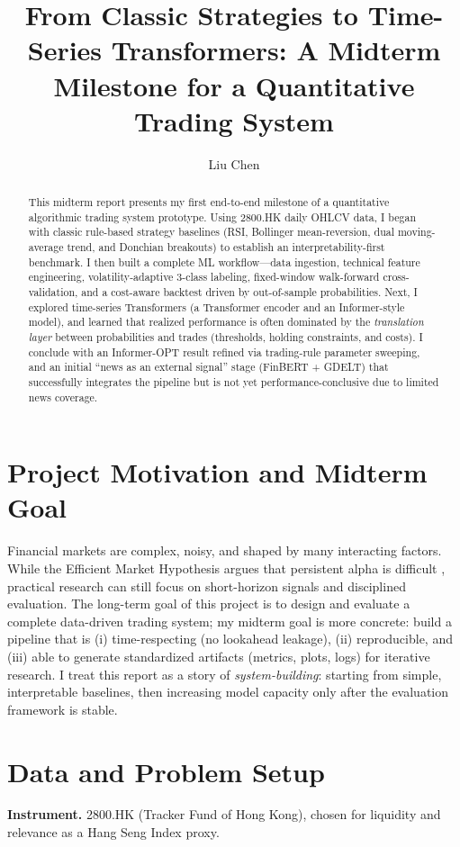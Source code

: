 \documentclass[letterpaper]{article} %
\title{From Classic Strategies to Time-Series Transformers: A Midterm Milestone for a Quantitative Trading System}
\author{
Liu Chen\\
}
\begin{document}
\maketitle

\begin{abstract}
This midterm report presents my first end-to-end milestone of a quantitative algorithmic trading system prototype. Using 2800.HK daily OHLCV data, I began with classic rule-based strategy baselines (RSI, Bollinger mean-reversion, dual moving-average trend, and Donchian breakouts) to establish an interpretability-first benchmark. I then built a complete ML workflow---data ingestion, technical feature engineering, volatility-adaptive 3-class labeling, fixed-window walk-forward cross-validation, and a cost-aware backtest driven by out-of-sample probabilities. Next, I explored time-series Transformers (a Transformer encoder and an Informer-style model), and learned that realized performance is often dominated by the \emph{translation layer} between probabilities and trades (thresholds, holding constraints, and costs). I conclude with an Informer-OPT result refined via trading-rule parameter sweeping, and an initial ``news as an external signal'' stage (FinBERT + GDELT) that successfully integrates the pipeline but is not yet performance-conclusive due to limited news coverage.
\end{abstract}

\section{Project Motivation and Midterm Goal}
Financial markets are complex, noisy, and shaped by many interacting factors. While the Efficient Market Hypothesis argues that persistent alpha is difficult \citep{fama1970}, practical research can still focus on short-horizon signals and disciplined evaluation. The long-term goal of this project is to design and evaluate a complete data-driven trading system; my midterm goal is more concrete: build a pipeline that is (i) time-respecting (no lookahead leakage), (ii) reproducible, and (iii) able to generate standardized artifacts (metrics, plots, logs) for iterative research. I treat this report as a story of \emph{system-building}: starting from simple, interpretable baselines, then increasing model capacity only after the evaluation framework is stable.

\section{Data and Problem Setup}
\textbf{Instrument.} 2800.HK (Tracker Fund of Hong Kong), chosen for liquidity and relevance as a Hang Seng Index proxy.
\end{document}
